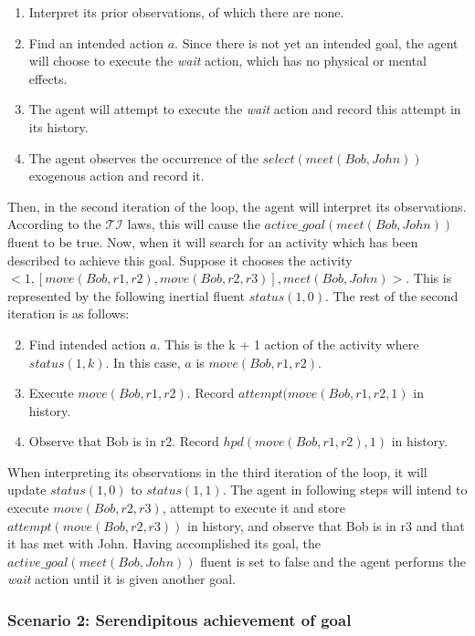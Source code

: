\begin{enumerate}
    \item Interpret its prior observations, of which there are none.
    \item Find an intended action $a$.
        Since there is not yet an intended goal, the agent will choose to execute the \textit{wait} action, which has no physical or mental effects.
    \item The agent will attempt to execute the \textit{wait} action and record this attempt in its history.
    \item The agent observes the occurrence of the $select(meet(Bob, John))$ exogenous action and record it.
\end{enumerate}

Then, in the second iteration of the loop, the agent will interpret its observations.
According to the $\mathcal{TI}$ laws, this will cause the $active\_goal(meet(Bob, John))$ fluent to be true.
Now, when it will search for an activity which has been described to achieve this goal.
Suppose it chooses the activity $<1, [move(Bob, r1,r2), move(Bob, r2, r3)],meet(Bob,John)>$.
This is represented by the following inertial fluent $status(1,0)$.
The rest of the second iteration is as follows:

\begin{enumerate}
    \setcounter{enumi}{1}
    \item Find intended action $a$.
        This is the k + 1 action of the activity where $status(1, k)$.
        In this case, $a$ is $move(Bob, r1, r2)$.
    \item Execute $move(Bob, r1, r2)$.
        Record $attempt(move(Bob, r1, r2, 1)$ in history.
    \item Observe that Bob is in r2.
        Record $hpd(move(Bob, r1, r2),1)$ in history.
\end{enumerate}

When interpreting its observations in the third iteration of the loop, it will update $status(1,0)$ to $status(1,1)$.
The agent in following steps will intend to execute $move(Bob, r2, r3)$, attempt to execute it and store $attempt(move(Bob, r2, r3))$ in history, and observe that Bob is in r3 and that it has met with John.
Having accomplished its goal, the $active\_goal(meet(Bob, John))$ fluent is set to false and the agent performs the \textit{wait} action until it is given another goal.

\subsubsection{Scenario 2: Serendipitous achievement of goal~\citep{blount_towards_2014}}
\label{subsubsec:aia_scenario_2}

